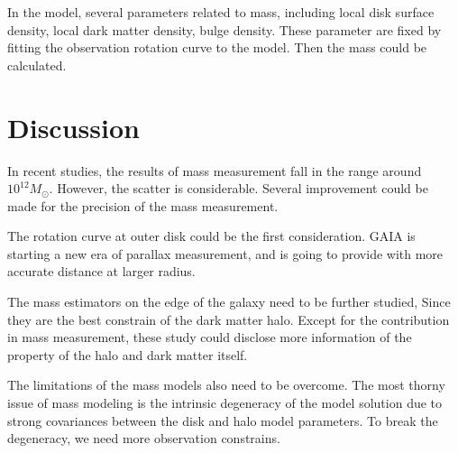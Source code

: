 \documentclass[preprint]{aastex}
\begin{document}
     In the model, several parameters related to mass, including local
disk surface density, local dark matter density, bulge density. These
parameter are fixed by fitting the observation rotation curve to the
model. Then the mass could be calculated.
     
     \section{Discussion} In recent studies, the results of mass
measurement fall in the range around $10^{12} M_{\odot}$. However, the
scatter is considerable. Several improvement could be made for the
precision of the mass measurement.

     The rotation curve at outer disk could be the first
consideration. GAIA is starting a new era of parallax measurement, and
is going to provide with more accurate distance at larger radius.

     The mass estimators on the edge of the galaxy need to be further
studied, Since they are the best constrain of the dark matter
halo. Except for the contribution in mass measurement, these study
could disclose more information of the property of the halo and dark
matter itself.

     The limitations of the mass models also need to be overcome. The
most thorny issue of mass modeling is the intrinsic degeneracy of the
model solution due to strong covariances between the disk and halo
model parameters. To break the degeneracy, we need more observation
constrains.

\end{document}

